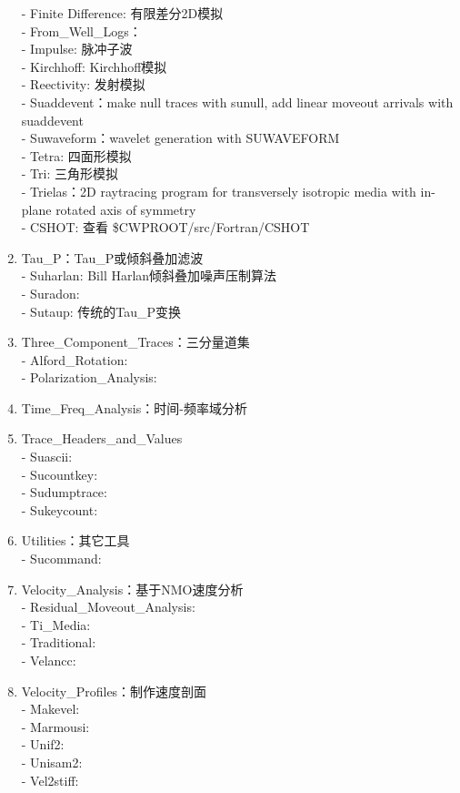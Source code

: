 \begin{enumerate}
	- Finite Difference: 有限差分2D模拟\\
	- From\_Well\_Logs：	\\
	- Impulse: 脉冲子波	\\
	- Kirchhoff: Kirchhoff模拟\\	
	- Reectivity: 发射模拟	\\
	- Suaddevent：make null traces with sunull, add linear moveout arrivals with suaddevent	\\
	- Suwaveform：wavelet generation with SUWAVEFORM	\\
	- Tetra: 四面形模拟\\
	- Tri: 三角形模拟	\\
	- Trielas：2D raytracing program for transversely isotropic media with in-plane rotated axis of symmetry	\\
	- CSHOT: 查看 \$CWPROOT/src/Fortran/CSHOT
	\item Tau\_P：Tau\_P或倾斜叠加滤波\\
	- Suharlan: Bill Harlan倾斜叠加噪声压制算法\\
	- Suradon: \\
	- Sutaup: 传统的Tau\_P变换
	\item Three\_Component\_Traces：三分量道集\\
	- Alford\_Rotation: \\
	- Polarization\_Analysis: 
	\item Time\_Freq\_Analysis：时间-频率域分析
	\item Trace\_Headers\_and\_Values\\
	- Suascii: \\
	- Sucountkey: \\
	- Sudumptrace: \\
	- Sukeycount: 
	\item Utilities：其它工具\\
	- Sucommand: 
	\item Velocity\_Analysis：基于NMO速度分析\\
	- Residual\_Moveout\_Analysis: \\
	- Ti\_Media: \\
	- Traditional: 	\\
	- Velancc: 
	\item Velocity\_Profiles：制作速度剖面\\
	- Makevel: \\
	- Marmousi: \\
	- Unif2: \\
	- Unisam2: \\
	- Vel2stiff: \\

\end{enumerate}
